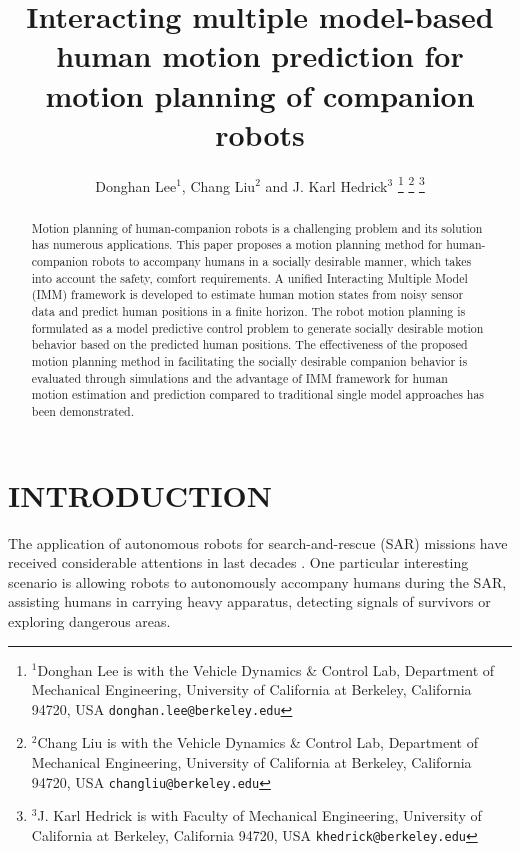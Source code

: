 \documentclass[letterpaper, 10 pt, conference]{ieeeconf}
\title{\LARGE \bf
	Interacting multiple model-based human motion prediction for motion planning of companion robots
}
\author{Donghan Lee$^{1}$, Chang Liu$^{2}$ and J. Karl Hedrick$^{3}$%
	\thanks{$^{1}$Donghan Lee is with the Vehicle Dynamics \& Control Lab, Department of Mechanical Engineering, University of California at Berkeley, California 94720, USA
		{\tt\small donghan.lee@berkeley.edu}}%
	\thanks{$^{2}$Chang Liu is with the Vehicle Dynamics \& Control Lab, Department of Mechanical Engineering, University of California at Berkeley, California 94720, USA
		{\tt\small changliu@berkeley.edu}}%
	\thanks{$^{3}$J. Karl Hedrick is with Faculty of Mechanical Engineering, University of California at Berkeley, California 94720, USA
		{\tt\small khedrick@berkeley.edu}}%
}
\begin{document}
	
	\maketitle
	\thispagestyle{empty}
	\pagestyle{empty}
	
	\begin{abstract}
		Motion planning of human-companion robots is a challenging problem and its solution has numerous applications.
		This paper proposes a motion planning method for human-companion robots to accompany humans in a socially desirable manner, which takes into account the safety, comfort requirements.
		A unified Interacting Multiple Model (IMM) framework is developed to estimate human motion states from noisy sensor data and predict human positions in a finite horizon.
		The robot motion planning is formulated as a model predictive control problem to generate socially desirable motion behavior based on the predicted human positions.
		The effectiveness of the proposed motion planning method in facilitating the socially desirable companion behavior is evaluated through simulations and the advantage of IMM framework for human motion estimation and prediction compared to traditional single model approaches has been demonstrated.
	\end{abstract}
	
	
	\section{INTRODUCTION} \label{sec:intro}
	The application of autonomous robots for search-and-rescue (SAR) missions have received considerable attentions in last decades \cite{casper2003human,nourbakhsh2005human,kruijff2012designing}.
	One particular interesting scenario is allowing robots to autonomously accompany humans during the SAR, assisting humans in carrying heavy apparatus, detecting signals of survivors or exploring dangerous areas.
	
\end{document}
